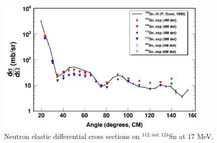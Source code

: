 \begin{figure}
  \begin{center}
\includegraphics[width = 0.9\textwidth]{figures/neutronECS_Sn_17MeV.png}
\caption{Neutron elastic differential cross sections on $^{112,nat,124}$Sn at 17
MeV.} \label{SnECS_17MeV}
\end{center}
\end{figure}



\afterpage{\clearpage}
